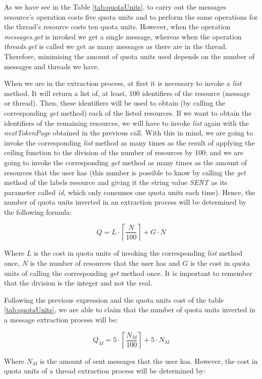 As we have see in the Table \ref{tab:quotaUnits}, to carry out the messages resource's operation costs five quota units and to perform the same operations for the thread's resource costs ten quota units. However, when the operation \textit{messages.get} is invoked we get a single message, whereas when the operation \textit{threads.get} is called we get as many messages as there are in the thread. Therefore, minimising the amount of quota units used depends on the number of messages and threads we have.

When we are in the extraction process, at first it is necessary to invoke a \textit{list} method. It will return a list of, at least, 100 identifiers of the resource (message or thread). Then, these identifiers will be used to obtain (by calling the corresponding \textit{get} method) each of the listed resources. If we want to obtain the identifiers of the remaining resources, we will have to invoke \textit{list} again with the \textit{nextTokenPage} obtained in the previous call. With this in mind, we are going to invoke the corresponding \textit{list} method as many times as the result of applying the ceiling function to the division of the number of resources by 100; and we are going to invoke the corresponding \textit{get} method as many times as the amount of resources that the user has (this number is possible to know by calling the \textit{get} method of the labels resource and giving it the string value \textit{SENT} as its parameter called \textit{id}, which only consumes one quota units each time). Hence, the number of quota units inverted in an extraction process will be determined by the following formula:

$$
Q = L\cdot\left\lceil\frac{N}{100}\right\rceil+G\cdot N
$$

Where $L$ is the cost in quota units of invoking the corresponding \textit{list} method once, $N$ is the number of resources that the user has and $G$ is the cost in quota units of calling the corresponding \textit{get} method once. It is important to remember that the division is the integer and not the real.

Following the previous expression and the quota units cost of the table \ref{tab:quotaUnits}, we are able to claim that the number of quota units inverted in a message extraction process will be:

$$
Q_M = 5\cdot\left\lceil\frac{N_M}{100}\right\rceil+5\cdot N_M
$$

Where $N_M$ is the amount of sent messages that the user has. However, the cost in quota units of a thread extraction process will be determined by:

